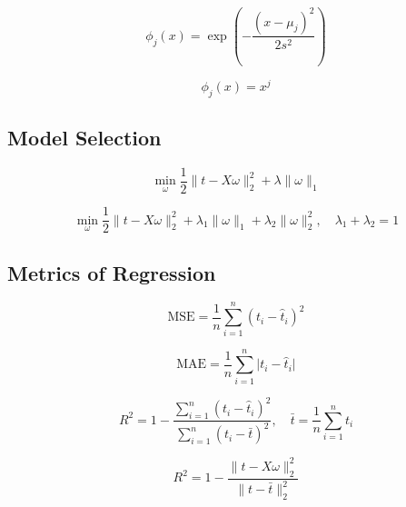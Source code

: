 \documentclass[10pt]{article}
\begin{document}
\begin{multicols}{2}
\begin{equation}
    \phi_{j}(x) = \exp\left(-\frac{(x - \mu_{j})^{2}}{2s^{2}}\right)
\end{equation}

\begin{equation}
    \phi_{j}(x) = x^{j}
\end{equation}

\subsection*{Model Selection}
\begin{equation}
    \label{eq:lasso}
    \min_{\omega} \frac{1}{2} \lVert{t - X\omega} \rVert^{2}_{2} + \lambda \lVert{\omega} \rVert_{1}
\end{equation}

\begin{equation}
    \label{eq:elastic-net}
    \min_{\omega} \frac{1}{2} \lVert{t - X\omega} \rVert^{2}_{2} + \lambda_{1} \lVert{\omega} \rVert_{1} + \lambda_{2} \lVert{\omega} \rVert^{2}_{2}, \quad \lambda_{1} + \lambda_{2} = 1
\end{equation}

\subsection*{Metrics of Regression}
\begin{equation}
    \label{eq:mse}
    \text{MSE} = \frac{1}{n} \sum_{i=1}^{n} (t_{i} - \hat{t}_{i})^{2}
\end{equation}

\begin{equation}
    \label{eq:mae}
    \text{MAE} = \frac{1}{n} \sum_{i=1}^{n} \lvert t_{i} - \hat{t}_{i} \rvert
\end{equation}

\begin{equation}
    \label{eq:r-squared}
    R^{2} = 1 - \frac{\sum_{i=1}^{n} (t_{i} - \hat{t}_{i})^{2}}{\sum_{i=1}^{n} (t_{i} - \bar{t})^{2}}, \quad \bar{t} = \frac{1}{n} \sum_{i=1}^{n} t_{i}
\end{equation}

\begin{equation}
    \label{eq:r-squared-2}
    R^{2} = 1 - \frac{\lVert{t - X\omega} \rVert^{2}_{2}}{\lVert{t - \bar{t}} \rVert^{2}_{2}}
\end{equation}


\end{multicols}
\end{document}
